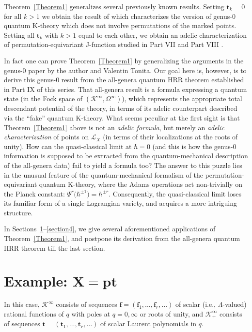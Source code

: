 \documentclass[pdftex]{sigma}
\def\K{\mathcal K}
\def\L{\mathcal L}
\def\f{{\mathbf f}}
\def\t{{\mathbf t}}
\def\h{\hbar}
\begin{document}
Theorem~\ref{Theorem1} generalizes several previously known results. Setting $\t_k=0$ for all $k>1$ we obtain the result of \cite{GiTo} which characterizes the version of genus-0 quantum K-theory which does not involve permutations of the marked points. Setting all $\t_k$ with $k>1$ equal to each other, we obtain an adelic characterization of permutation-equivariant J-function studied in Part VII and
Part VIII \cite{GiVII,GiVIII}.

In fact one can prove Theorem~\ref{Theorem1} by generalizing the arguments in the genus-$0$ paper \cite{GiTo} by the author and Valentin Tonita. Our goal here is, however,
is to derive this genus-$0$ result from the all-genera quantum HRR theorem established in Part IX of this series. That all-genera result is a formula expressing a quantum state (in the Fock space of $(\K^{\infty},\Omega^{\infty})$), which represents the appropriate total descendant potential of the theory, in terms of its adelic counterpart described via the ``fake'' quantum K-theory. What seems peculiar at the first sight is that Theorem~\ref{Theorem1} above is not an {\em adelic formula}, but merely an {\em adelic characterization} of points on $\L_X$ (in terms of their localizations at the roots of unity). How can the quasi-classical limit at $\h=0$ (and this is how the genus-$0$ information is supposed to be extracted from the quantum-mechanical description of the all-genera data) fail to yield a formula too? The answer to this puzzle lies in the unusual feature of the quantum-mechanical formalism of the permutation-equivariant quantum K-theory, where the Adams operations act non-trivially on the Planck constant: $\Psi^r\big(\h^{\pm 1}\big)=\h^{\pm r}$. Consequently, the quasi-classical limit loses its familiar form of a single Lagrangian variety, and acquires a more intriguing structure.

In Sections~\ref{section2}--\ref{section4}, we give several aforementioned applications of Theorem~\ref{Theorem1}, and postpone its derivation from the all-genera quantum HRR theorem till the last
section.

\section[Example: $X=pt$]{Example: $\boldsymbol{X=pt}$}\label{section2}

In this case, $\K^{\infty}$ consists of sequences $\f=(\f_1,\dots,\f_r,\dots)$
of scalar (i.e., $\Lambda$-valued) rational functions of $q$ with poles at $q=0,\infty$ or roots of unity, and $\K_{+}^{\infty}$ consists of sequences
$\t = (\t_1,\dots,\t_r,\dots )$ of scalar Laurent polynomials in $q$.
\end{document}
